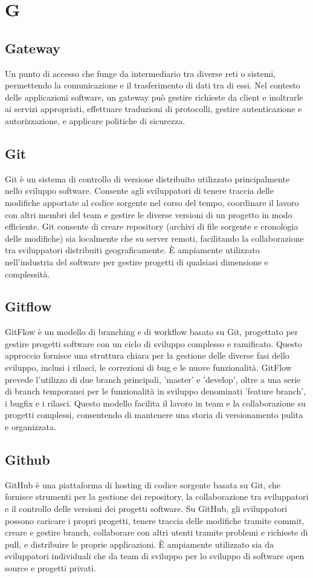 \section*{G} 
\subsection*{Gateway} 
Un punto di accesso che funge da intermediario tra diverse reti o sistemi, permettendo la comunicazione e il trasferimento di dati tra di essi. Nel contesto delle applicazioni software, un gateway può gestire richieste da client e inoltrarle ai servizi appropriati, effettuare traduzioni di protocolli, gestire autenticazione e autorizzazione, e applicare politiche di sicurezza.
\subsection*{Git} 
Git è un sistema di controllo di versione distribuito utilizzato principalmente nello sviluppo software. Consente agli sviluppatori di tenere traccia delle modifiche apportate al codice sorgente nel corso del tempo, coordinare il lavoro con altri membri del team e gestire le diverse versioni di un progetto in modo efficiente. Git consente di creare repository (archivi di file sorgente e cronologia delle modifiche) sia localmente che su server remoti, facilitando la collaborazione tra sviluppatori distribuiti geograficamente. È ampiamente utilizzato nell'industria del software per gestire progetti di qualsiasi dimensione e complessità.
\subsection*{Gitflow} 
GitFlow è un modello di branching e di workflow basato su Git, progettato per gestire progetti software con un ciclo di sviluppo complesso e ramificato. Questo approccio fornisce una struttura chiara per la gestione delle diverse fasi dello sviluppo, inclusi i rilasci, le correzioni di bug e le nuove funzionalità. GitFlow prevede l'utilizzo di due branch principali, 'master' e 'develop', oltre a una serie di branch temporanei per le funzionalità in sviluppo denominati 'feature branch', i bugfix e i rilasci. Questo modello facilita il lavoro in team e la collaborazione su progetti complessi, consentendo di mantenere una storia di versionamento pulita e organizzata.
\subsection*{Github} 
GitHub è una piattaforma di hosting di codice sorgente basata su Git, che fornisce strumenti per la gestione dei repository, la collaborazione tra sviluppatori e il controllo delle versioni dei progetti software. Su GitHub, gli sviluppatori possono caricare i propri progetti, tenere traccia delle modifiche tramite commit, creare e gestire branch, collaborare con altri utenti tramite problemi e richieste di pull, e distribuire le proprie applicazioni. È ampiamente utilizzato sia da sviluppatori individuali che da team di sviluppo per lo sviluppo di software open source e progetti privati.
